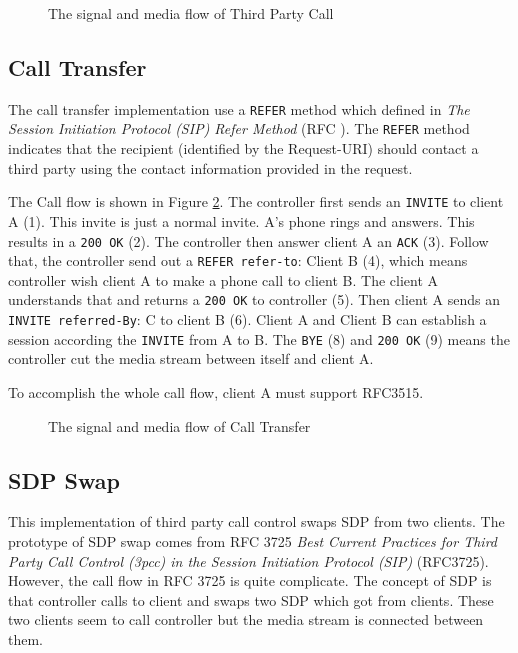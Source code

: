 \begin{figure}[!hbtp]
\centering
{}
\caption{The signal and media flow of Third Party Call}
\label{fig:TheSignalAndMediaFlowOf3pc}
\end{figure}

\subsection{Call Transfer}
\label{sec:Solution:ThirdPartyCall:CallTransfer}

The call transfer implementation use a \texttt{REFER} method which defined in \textit{The Session Initiation Protocol (SIP) Refer Method} (RFC )\cite{RFC3515}. The \texttt{REFER} method indicates that the recipient (identified by the Request-URI) should contact a third party using the contact information provided in the request\cite{RFC3515}. 

The Call flow is shown in Figure \ref{fig:CallTransfer}. The controller first sends an \texttt{INVITE} to client A (1). This invite is just a normal invite. A's phone rings and answers. This results in a \texttt{200 OK} (2). The controller then answer client A an \texttt{ACK} (3). Follow that, the controller send out a \texttt{REFER refer-to}: Client B (4), which means controller wish client A to make a phone call to client B. The client A understands that and returns a \texttt{200 \nobreak OK} to controller (5). Then client A sends an \texttt{INVITE referred-By}: C to client B (6). Client A and Client B can establish a session according the \texttt{INVITE} from A to B.  The \texttt{BYE} (8) and \texttt{200 \nobreak OK} (9) means the controller cut the media stream between itself and client A. 

To accomplish the whole call flow, client A must support RFC3515.

\begin{figure}[!hbtp]
\centering
{}
\caption{The signal and media flow of Call Transfer}
\label{fig:CallTransfer}
\end{figure}

\subsection{SDP Swap}
\label{sec:Solution:ThirdPartyCall:SDPSwep}

This implementation of third party call control swaps SDP from two clients. The prototype of SDP swap comes from RFC 3725 \textit{Best Current Practices for Third Party Call Control (3pcc) in the Session Initiation Protocol (SIP)} (RFC3725). However, the call flow in RFC 3725 is quite complicate. The concept of SDP is that controller calls to client and swaps two SDP which got from clients. These two clients seem to call controller but the media stream is connected between them.

